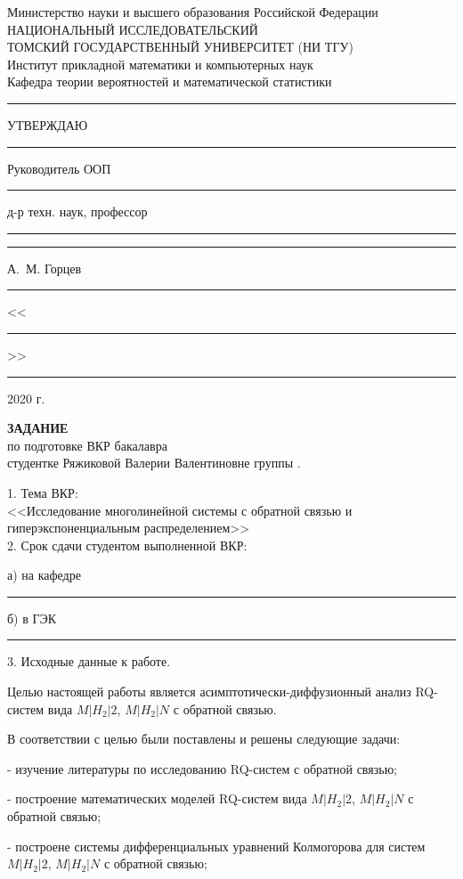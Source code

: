 \begin{center}
	Министерство науки и высшего образования Российской Федерации\\
	НАЦИОНАЛЬНЫЙ ИССЛЕДОВАТЕЛЬСКИЙ\\
	ТОМСКИЙ ГОСУДАРСТВЕННЫЙ УНИВЕРСИТЕТ (НИ ТГУ)\\
	Институт прикладной математики и компьютерных наук\\
	Кафедра теории вероятностей и математической статистики\\[30pt]
\end{center}

\noindent\rule{105mm}{0pt}УТВЕРЖДАЮ\\
\rule{105mm}{0pt}Руководитель ООП\\
\rule{105mm}{0pt}д-р техн. наук, профессор\\
\rule{105mm}{0pt}\rule{34mm}{0.4pt} А.~М. Горцев\\
\rule{105mm}{0pt}<<\rule{10mm}{0.4pt}>>\rule{25mm}{0.4pt} 2020 г.\\

\begin{center}
	\textbf{ЗАДАНИЕ}\\
	по подготовке ВКР бакалавра\\
	студентке Ряжиковой Валерии Валентиновне группы .\\
\end{center}

1. Тема ВКР:\\
<<Исследование многолинейной системы с обратной связью и гиперэкспоненциальным распределением>>\\

2. Срок сдачи студентом выполненной ВКР:

а) на кафедре\rule{70mm}{0.4pt}

б) в ГЭК\rule{79mm}{0.4pt}

3. Исходные данные к работе.

Целью настоящей работы является асимптотически-диффузионный анализ RQ-систем вида $M|H_2|2$, $M|H_2|N$ с обратной связью.

В соответствии с целью были поставлены и решены следующие задачи:

- изучение литературы по исследованию RQ-систем с обратной связью;

- построение математических моделей RQ-систем вида $M|H_2|2$, $M|H_2|N$ с обратной связью;

- построене системы дифференциальных уравнений Колмогорова для систем $M|H_2|2$, $M|H_2|N$ с обратной связью;

